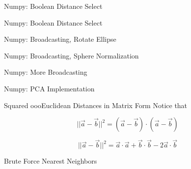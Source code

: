 \documentclass{beamer}
\begin{document}
\begin{frame}{Numpy: Boolean Distance Select}



\end{frame}


\begin{frame}{Numpy: Boolean Distance Select}



\end{frame}

\begin{frame}{Numpy: Broadcasting, Rotate Ellipse}



\end{frame}


\begin{frame}{Numpy: Broadcasting, Sphere Normalization}



\end{frame}

\begin{frame}{Numpy: More Broadcasting}



\end{frame}

\begin{frame}{Numpy: PCA Implementation}



\end{frame}

\begin{frame}{Squared oooEuclidean Distances in Matrix Form}
Notice that

\[ ||\vec{a} - \vec{b}||^2 = (\vec{a} - \vec{b}) \cdot (\vec{a}-\vec{b}) \]

\[ ||\vec{a} - \vec{b}||^2 = \vec{a} \cdot \vec{a} + \vec{b} \cdot \vec{b} - 2 \vec{a} \cdot \vec{b} \]


\end{frame}

\begin{frame}{Brute Force Nearest Neighbors}



\end{frame}
\end{document}
